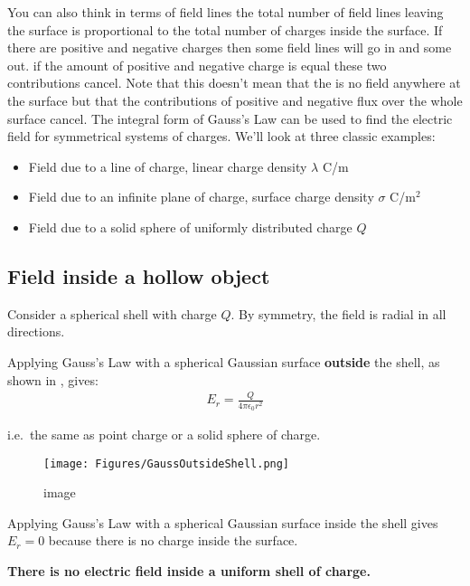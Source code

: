 \documentclass[
]{book}
\theoremstyle{definition}
\theoremstyle{definition}
\theoremstyle{definition}
\theoremstyle{definition}
\theoremstyle{remark}
\begin{document}
You can also think in terms of field lines the total number of field
lines leaving the surface is proportional to the total number of charges
inside the surface. If there are positive and negative charges then some
field lines will go in and some out. if the amount of positive and
negative charge is equal these two contributions cancel. Note that this
doesn't mean that the is no field anywhere at the surface but that the
contributions of positive and negative flux over the whole surface
cancel. The integral form of Gauss's Law can be used to find the
electric field for symmetrical systems of charges. We'll look at three
classic examples:

\begin{itemize}
\item
  Field due to a line of charge, linear charge density \(\lambda\) C/m
\item
  Field due to an infinite plane of charge, surface charge density
  \(\sigma\) C/m\(^2\)
\item
  Field due to a solid sphere of uniformly distributed charge \(Q\)
\end{itemize}

\hypertarget{field-inside-a-hollow-object}{%
\subsection{Field inside a hollow object}\label{field-inside-a-hollow-object}}

Consider a spherical shell with charge \(Q\). By symmetry, the field is
radial in all directions.

Applying Gauss's Law with a spherical Gaussian surface \textbf{outside} the
shell, as shown in , gives: \[\begin{aligned}
E_r = \frac{Q}{4\pi\epsilon_0 r^2} 
\end{aligned}\]

i.e.~the same as point charge or a solid sphere of charge.

\begin{figure}
\centering
\texttt{[image: Figures/GaussOutsideShell.png]}
\caption{image}
\end{figure}

Applying Gauss's Law with a spherical Gaussian surface inside the shell
gives \(E_r = 0\) because there is no charge inside the surface.

\textbf{There is no electric field inside a uniform shell of charge.}
\end{document}
